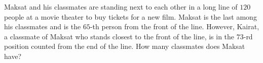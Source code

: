 Maksat and his classmates are standing next to each other in a long line of $120$ people at a movie theater to buy tickets for a new film. Maksat is the last among his classmates and is the $65$-th person from the front of the line. However, Kairat, a classmate of Maksat who stands closest to the front of the line, is in the $73$-rd position counted from the end of the line. How many classmates does Maksat have?
